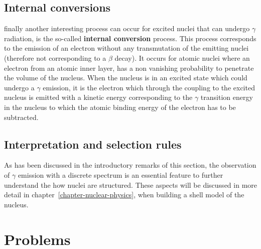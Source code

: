 \subsection{Internal conversions}

finally another interesting process can occur for excited nuclei that can undergo $\gamma$ radiation, is the so-called {\bf internal conversion} process. This process corresponds to the emission of an electron without any transmutation of the emitting nuclei (therefore not corresponding to a $\beta$ decay). It occurs for atomic nuclei where an electron from an atomic inner layer, has a non vanishing probability to penetrate the volume of the nucleus. When the nucleus is in an excited state which could undergo a $\gamma$ emission, it is the electron which through the coupling to the excited nucleus is emitted with a kinetic energy corresponding to the $\gamma$ transition energy in the nucleus to which the atomic binding energy of the electron has to be subtracted.

\subsection{Interpretation and selection rules}

As has been discussed in the introductory remarks of this section, the observation of $\gamma$ emission with a discrete spectrum is an essential feature to further understand the how nuclei are structured. These aspects will be discussed in more detail in chapter~\ref{chapter-nuclear-physics}, when building a shell model of the nucleus. \\




\section{Problems}

